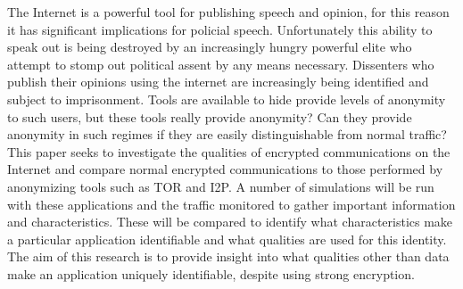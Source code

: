 \abstract The Internet is a powerful tool for publishing speech and opinion, for this reason it has significant implications for policial speech. Unfortunately this ability to speak out is being destroyed by an increasingly hungry powerful elite who attempt to stomp out political assent by any means necessary. Dissenters who publish their opinions using the internet are increasingly being identified and subject to imprisonment. Tools are available to hide provide levels of anonymity to such users, but these tools really provide anonymity? Can they provide anonymity in such regimes if they are easily distinguishable from normal traffic? This paper seeks to investigate the qualities of encrypted communications on the Internet and compare normal encrypted communications to those performed by anonymizing tools such as TOR and I2P. A number of simulations will be run with these applications and the traffic monitored to gather important information and characteristics. These will be compared to identify what characteristics make a particular application identifiable and what qualities are used for this identity. The aim of this research is to provide insight into what qualities other than data make an application uniquely identifiable, despite using strong encryption.


